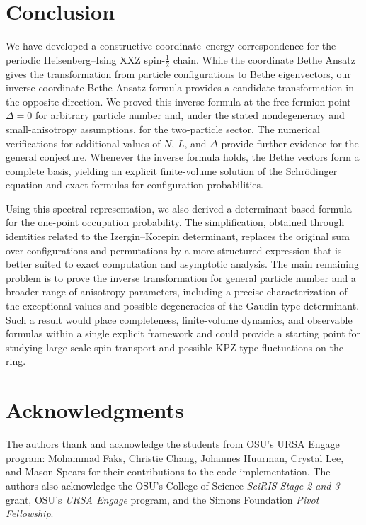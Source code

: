 \documentclass[a4paper,11pt]{article}
\theoremstyle{definition}
\begin{document}
\section{Conclusion}

We have developed a constructive coordinate--energy correspondence for the periodic Heisenberg--Ising XXZ spin-$\tfrac12$ chain.  While the coordinate Bethe Ansatz gives the transformation from particle configurations to Bethe eigenvectors, our inverse coordinate Bethe Ansatz formula provides a candidate transformation in the opposite direction.  We proved this inverse formula at the free-fermion point $\Delta=0$ for arbitrary particle number and, under the stated nondegeneracy and small-anisotropy assumptions, for the two-particle sector.  The numerical verifications for additional values of $N$, $L$, and $\Delta$ provide further evidence for the general conjecture.  Whenever the inverse formula holds, the Bethe vectors form a complete basis, yielding an explicit finite-volume solution of the Schr\"odinger equation and exact formulas for configuration probabilities.

Using this spectral representation, we also derived a determinant-based formula for the one-point occupation probability.  The simplification, obtained through identities related to the Izergin--Korepin determinant, replaces the original sum over configurations and permutations by a more structured expression that is better suited to exact computation and asymptotic analysis.  The main remaining problem is to prove the inverse transformation for general particle number and a broader range of anisotropy parameters, including a precise characterization of the exceptional values and possible degeneracies of the Gaudin-type determinant.  Such a result would place completeness, finite-volume dynamics, and observable formulas within a single explicit framework and could provide a starting point for studying large-scale spin transport and possible KPZ-type fluctuations on the ring.



\section*{Acknowledgments}
The authors thank and acknowledge the students from OSU's URSA Engage program: Mohammad Faks, Christie Chang, Johannes Huurman, Crystal Lee, and Mason Spears for their contributions to the code implementation. The authors also acknowledge the OSU's College of Science \textit{SciRIS Stage 2 and 3} grant, OSU's \textit{URSA Engage} program, and the Simons Foundation \textit{Pivot Fellowship}. 

\printbibliography
\end{document}
